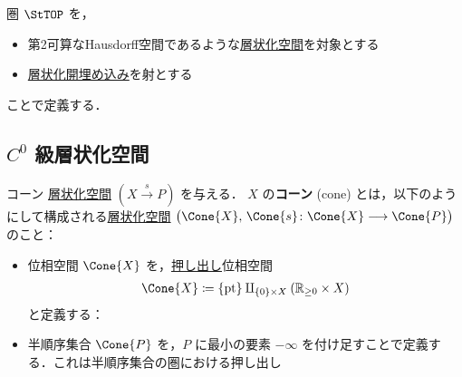 \documentclass[TQFT_main]{subfiles}
\begin{document}
圏 $\StTOP$ を，
\begin{itemize}
    \item 第2可算なHausdorff空間であるような\hyperref[def:stratified-space]{層状化空間}を対象とする
    \item \hyperref[def:strat-emb]{層状化開埋め込み}を射とする
\end{itemize}
ことで定義する．

\subsection{$C^0$ 級層状化空間}


\begin{mydef}[label=def:str-cone,breakable]{コーン}
    \hyperref[def:stratified-space]{層状化空間} $(X \xrightarrow{s} P)$ を与える．
    $X$ の\textbf{コーン} (cone) とは，以下のようにして構成される\hyperref[def:stratified-space]{層状化空間} $\bigl( \Cone{X},\, \Cone{s} \colon \Cone{X} \lto \Cone{P} \bigr)$ のこと：
    \begin{itemize}
        \item 位相空間 $\Cone{X}$ を，\hyperref[def:pullback-pushout]{押し出し}位相空間
        \begin{align}
            \Cone{X} \coloneqq \{\mathrm{pt}\} \amalg_{\{0\} \times X} (\mathbb{R}_{\ge 0} \times X)
        \end{align}
        と定義する：
        \begin{center}
        \end{center}
        \item 半順序集合 $\Cone{P}$ を，$P$ に最小の要素 $-\infty$ を付け足すことで定義する．これは半順序集合の圏における押し出し

\end{itemize}
\end{mydef}
\end{document}
